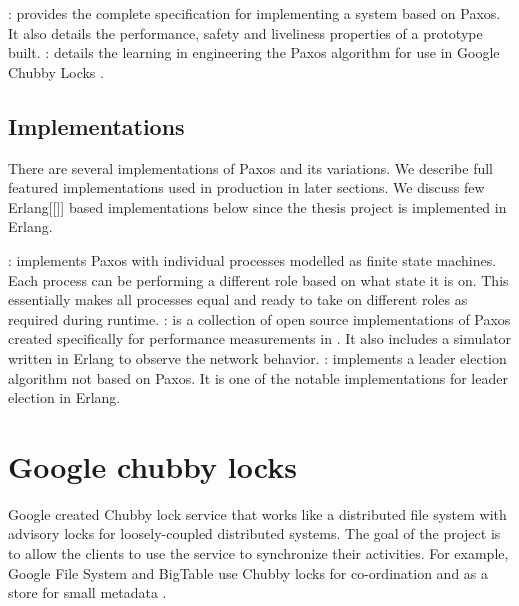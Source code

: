 \begin{itemize}
    : \citet{Kirsch08paxosfor} provides the
    complete specification for implementing a system based on Paxos. It also
    details the performance, safety and liveliness properties of a prototype
    built.
    : \cite{ChandraGR07}
    details the learning in engineering the Paxos algorithm for use in
    Google Chubby Locks \citep{Burrows06}.
\end{itemize}

\subsection{Implementations}

There are several implementations of Paxos and its variations. We describe full
featured implementations used in production in later sections. We discuss few
Erlang[[]] based implementations below since the thesis project is implemented
in Erlang.

\begin{itemize}
    : \citep{Uenishi2012} implements Paxos with
    individual processes modelled as finite state machines. Each process can
    be performing a different role based on what state it is on. This 
    essentially makes all processes equal and ready to take on different roles
    as required during runtime.
    : \citet{Lugano2012} is a collection of open source 
    implementations of Paxos created specifically for performance measurements
    in \citet{MarandiPSP10}. It also includes a simulator written in Erlang to
    observe the network behavior.
    : \citet{Ulf2012} implements a leader election algorithm
    not based on Paxos. It is one of the notable implementations for leader
    election in Erlang.
\end{itemize}

\section{Google chubby locks}
\label{section:chubby.locks}

Google created Chubby lock service \citep{Burrows06} that works like a 
distributed file system with advisory locks for loosely-coupled distributed 
systems. The goal of the project is to allow the clients to use the service
to synchronize their activities. For example, Google File System \citep{gfs} 
and BigTable \citep{ChangDGHWBCFG06} use Chubby locks for co-ordination and
as a store for small metadata \citep{ChandraGR07}.


